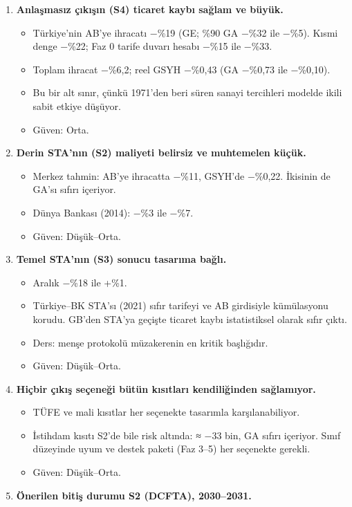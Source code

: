 \begin{enumerate}
\def\labelenumi{\arabic{enumi}.}
\tightlist
\item
  \textbf{Anlaşmasız çıkışın (S4) ticaret kaybı sağlam ve büyük.}

  \begin{itemize}
  \tightlist
  \item
    Türkiye'nin AB'ye ihracatı −\%19 (GE; \%90 GA −\%32 ile −\%5). Kısmi denge −\%22; Faz 0 tarife duvarı hesabı −\%15 ile −\%33.
  \item
    Toplam ihracat −\%6,2; reel GSYH −\%0,43 (GA −\%0,73 ile −\%0,10).
  \item
    Bu bir alt sınır, çünkü 1971'den beri süren sanayi tercihleri modelde ikili sabit etkiye düşüyor.
  \item
    \etiketT{} Güven: Orta.
  \end{itemize}
\item
  \textbf{Derin STA'nın (S2) maliyeti belirsiz ve muhtemelen küçük.}

  \begin{itemize}
  \tightlist
  \item
    Merkez tahmin: AB'ye ihracatta −\%11, GSYH'de −\%0,22. İkisinin de GA'sı sıfırı içeriyor.
  \item
    Dünya Bankası (2014): −\%3 ile −\%7.
  \item
    \etiketT{} Güven: Düşük--Orta.
  \end{itemize}
\item
  \textbf{Temel STA'nın (S3) sonucu tasarıma bağlı.}

  \begin{itemize}
  \tightlist
  \item
    Aralık −\%18 ile +\%1.
  \item
    Türkiye--BK STA'sı (2021) sıfır tarifeyi ve AB girdisiyle kümülasyonu korudu. GB'den STA'ya geçişte ticaret kaybı istatistiksel olarak sıfır çıktı.
  \item
    Ders: menşe protokolü müzakerenin en kritik başlığıdır.
  \item
    \etiketT{} Güven: Düşük--Orta.
  \end{itemize}
\item
  \textbf{Hiçbir çıkış seçeneği bütün kısıtları kendiliğinden sağlamıyor.}

  \begin{itemize}
  \tightlist
  \item
    TÜFE ve mali kısıtlar her seçenekte tasarımla karşılanabiliyor.
  \item
    İstihdam kısıtı S2'de bile risk altında: ≈ −33 bin, GA sıfırı içeriyor. Sınıf düzeyinde uyum ve destek paketi (Faz 3--5) her seçenekte gerekli.
  \item
    \etiketT{} Güven: Düşük--Orta.
  \end{itemize}
\item
  \textbf{Önerilen bitiş durumu S2 (DCFTA), 2030--2031.}


\end{enumerate}
